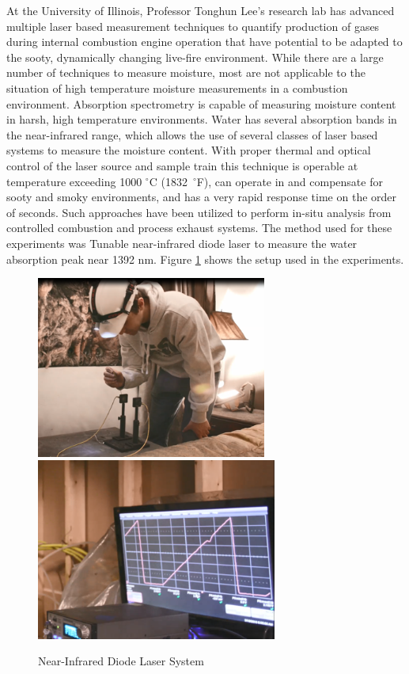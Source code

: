 \documentclass[12pt,oneside]{book}
\begin{document}
At the University of Illinois, Professor Tonghun Lee's research lab has advanced multiple laser based measurement techniques to quantify production of gases during internal combustion engine operation that have potential to be adapted to the sooty, dynamically changing live-fire environment. While there are a large number of techniques to measure moisture, most are not applicable to the situation of high temperature moisture measurements in a combustion environment.  Absorption spectrometry is capable of measuring moisture content in harsh, high temperature environments.  Water has several absorption bands in the near-infrared range, which allows the use of several classes of laser based systems to measure the moisture content.  With proper thermal and optical control of the laser source and sample train this technique is operable at temperature exceeding 1000 $^\circ$C (1832~$^\circ$F), can operate in and compensate for sooty and smoky environments, and has a very rapid response time on the order of seconds.  Such approaches have been utilized to perform in-situ analysis from controlled combustion and process exhaust systems.  The method used for these experiments was Tunable near-infrared diode laser to measure the water absorption peak near 1392 nm. Figure \ref{fig:Laser} shows the setup used in the experiments.

\begin{figure}[H]
	\centering
	\includegraphics[height = 2.35in]{0_Images/Instrumentation/Laser1}
	\includegraphics[height = 2.35in]{0_Images/Instrumentation/Laser2}
	\caption{Near-Infrared Diode Laser System}
	\label{fig:Laser}
\end{figure}
\end{document}
